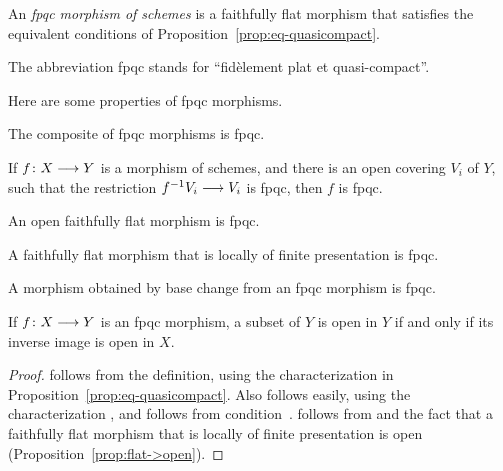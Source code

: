 \begin{2   CONTRAVARIANT FUNCTORS}
\begin{2.3 Sheaves in Grothendieck topologies}
\begin{definition}
An \emph{fpqc morphism of schemes} is a faithfully flat morphism that satisfies the equivalent conditions of Proposition~\ref{prop:eq-quasicompact}.
\end{definition}

The  abbreviation fpqc stands for ``fid\`element plat et quasi-compact''.

Here are some properties of fpqc morphisms.

\begin{proposition}\hfil

\begin{enumeratei} 

 The composite of fpqc morphisms is fpqc.

 If $f \colon X \arr Y$ is a morphism of schemes, and there is an open covering $V_i$ of $Y$, such that the restriction $f^{-1}V_i \arr V_i$ is fpqc, then $f$ is fpqc.

 An open faithfully flat morphism is fpqc.

 A faithfully flat morphism that is locally of finite
presentation is fpqc.


 A morphism obtained by base change from an fpqc morphism is fpqc.

 If $f \colon X \arr Y$ is an fpqc morphism, a subset of $Y$ is open in $Y$ if and only if its inverse image is open in $X$.
\end{enumeratei}

\end{proposition}

\begin{proof}  follows from the definition, using the characterization  in Proposition~\ref{prop:eq-quasicompact}. Also  follows easily, using the characterization , and  follows from condition~.  follows from  and the fact that a faithfully flat morphism that is locally of finite presentation is open (Proposition~\ref{prop:flat->open}).


\end{proof}
\end{2.3 Sheaves in Grothendieck topologies}
\end{2   CONTRAVARIANT FUNCTORS}
